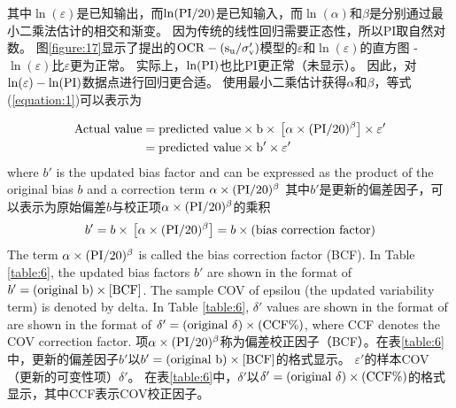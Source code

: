 \begin{Parallel}{0.60\textwidth}{}
{    }
    \ParallelRText
    {
        其中$\ln(\varepsilon)$是已知输出，而$\ln(\rm{PI}/20)$是已知输入，而$\ln(\alpha)$和$\beta$是分别通过最小二乘法估计的相交和渐变。 因为传统的线性回归需要正态性，所以PI取自然对数。 图\ref{figure:17}显示了\citet{Jamiolkowski198557}提出的$\rm{OCR}-(s_u/\sigma_v')$模型的$\varepsilon$和$\ln(\varepsilon)$的直方图 - $\ln(\varepsilon)$比$\varepsilon$更为正常。 实际上，$\ln(\rm{PI})$也比PI更正常（未显示）。 因此，对$\ln(\varepsilon)-\ln(\rm{PI})$数据点进行回归更合适。 使用最小二乘估计获得$\alpha$和$\beta$，等式(\ref{equation:1})可以表示为
    }
    \ParallelPar
    
    \begin{align}
        \begin{split}
            \rm{Actual~value}&=\rm{predicted~value}\times{}b\times{}\left[\alpha\times{}(\rm{PI}/20)^\beta\right]\times{}\varepsilon'\\
            &=\rm{predicted~value}\times{}b'\times{}\varepsilon'
        \end{split}
        \label{equation:6}
    \end{align}
    \ParallelLText
    {
        where $b'$ is the updated bias factor and can be expressed as the product of the original bias $b$ and a correction term $\alpha\times{}(\rm{PI}/20)^\beta$
    }
    \ParallelRText
    {
        其中$b'$是更新的偏差因子，可以表示为原始偏差$b$与校正项$\alpha\times{}(\rm{PI}/20)^\beta$的乘积
    }
    \ParallelPar
    \begin{align}
        b'=b\times{}\left[\alpha\times{}(\rm{PI}/20)^\beta\right]=b\times{}(\rm{bias~correction~factor})
        \label{equation:7}
    \end{align}
    \ParallelLText
    {
        The term  $\alpha\times{}(\rm{PI}/20)^\beta$ is called the bias correction factor (BCF). In Table \ref{table:6}, the updated bias factors $b'$ are shown in the format of $b'=(\rm{original}~b)\times{}[BCF]$. The sample COV of epsilou (the updated variability term) is denoted by delta. In Table \ref{table:6}, $\delta'$ values are shown in the format of are shown in the format of $\delta'=(\rm{original}~\delta)\times{}(\rm{CCF}\%)$, where CCF denotes the COV correction factor.
    }
    \ParallelRText
    {
        项$\alpha\times{}(\rm{PI}/20)^\beta$称为偏差校正因子（BCF）。在表\ref{table:6}中，更新的偏差因子$b'$以$b'=(\rm{original}~b)\times{}[BCF]$的格式显示。 $\varepsilon'$的样本COV（更新的可变性项）$\delta'$。 在表\ref{table:6}中，$\delta'$以$\delta'=(\rm{original}~\delta)\times{}(\rm{CCF}\%)$的格式显示，其中CCF表示COV校正因子。
}
\end{Parallel}
